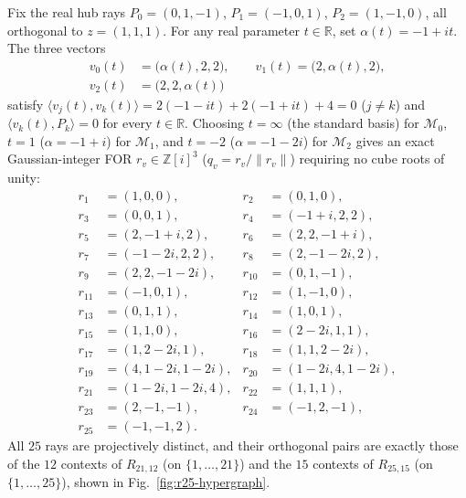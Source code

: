 \documentclass[aps,pra,reprint,superscriptaddress,longbibliography,nofootinbib,floatfix,10pt]{revtex4-2}
\theoremstyle{definition}\newtheorem{definition}[theorem]{Definition}
\theoremstyle{remark}\newtheorem{remark}[theorem]{Remark}
\begin{document}
Fix the real hub rays $P_0=(0,1,-1)$, $P_1=(-1,0,1)$, $P_2=(1,-1,0)$, all orthogonal to $z=(1,1,1)$. For any real parameter $t\in\mathbb R$, set $\alpha(t)=-1+it$. The three vectors
\begin{equation}\label{eq:R21-family}
\begin{aligned}
v_0(t)&=\bigl(\alpha(t),2,2\bigr),\qquad v_1(t)=\bigl(2,\alpha(t),2\bigr),\\
v_2(t)&=\bigl(2,2,\alpha(t)\bigr)
\end{aligned}
\end{equation}
satisfy $\langle v_j(t),v_k(t)\rangle=2(-1-it)+2(-1+it)+4=0$ ($j\ne k$) and $\langle v_k(t),P_k\rangle=0$ for every $t\in\mathbb R$. Choosing $t=\infty$ (the standard basis) for $\mathcal{M}_0$, $t=1$ ($\alpha=-1+i$) for $\mathcal{M}_1$, and $t=-2$ ($\alpha=-1-2i$) for $\mathcal{M}_2$ gives an exact Gaussian-integer FOR $r_v\in\mathbb Z[i]^3$ ($q_v=r_v/\|r_v\|$) requiring no cube roots of unity:
\begin{equation}\label{eq:R25-gaussian-vectors}
\begin{aligned}
r_1&=(1,0,0),&r_2&=(0,1,0),\\
r_3&=(0,0,1),&r_4&=(-1+i,2,2),\\
r_5&=(2,-1+i,2),&r_6&=(2,2,-1+i),\\
r_7&=(-1-2i,2,2),&r_8&=(2,-1-2i,2),\\
r_9&=(2,2,-1-2i),&r_{10}&=(0,1,-1),\\
r_{11}&=(-1,0,1),&r_{12}&=(1,-1,0),\\
r_{13}&=(0,1,1),&r_{14}&=(1,0,1),\\
r_{15}&=(1,1,0),&r_{16}&=(2-2i,1,1),\\
r_{17}&=(1,2-2i,1),&r_{18}&=(1,1,2-2i),\\
r_{19}&=(4,1-2i,1-2i),&r_{20}&=(1-2i,4,1-2i),\\
r_{21}&=(1-2i,1-2i,4),&r_{22}&=(1,1,1),\\
r_{23}&=(2,-1,-1),&r_{24}&=(-1,2,-1),\\
r_{25}&=(-1,-1,2).&&
\end{aligned}
\end{equation}
All $25$ rays are projectively distinct, and their orthogonal pairs are exactly those of the $12$ contexts of $R_{21,12}$ (on $\{1,\ldots,21\}$) and the $15$ contexts of $R_{25,15}$ (on $\{1,\ldots,25\}$), shown in Fig.~\ref{fig:r25-hypergraph}.
\end{document}
